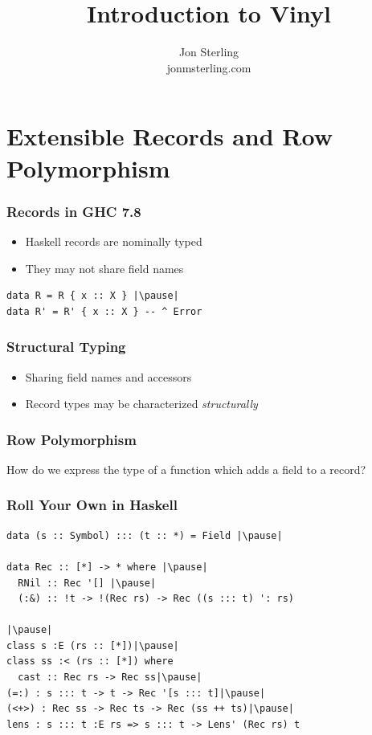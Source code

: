 \documentclass[tikz, 12pt]{beamer}
\title{Introduction to Vinyl}
\author{Jon Sterling\\
  jonmsterling.com
}
\begin{document}
\begin{frame}
\titlepage
\end{frame}

\section{Extensible Records and Row Polymorphism}

\begin{frame}[fragile]
  \frametitle{Records in GHC 7.8}\pause
  \begin{itemize}
    \item Haskell records are nominally typed\pause
    \item They may not share field names
  \end{itemize}
  \pause
  \begin{lstlisting}
data R = R { x :: X } |\pause|
data R' = R' { x :: X } -- ^ Error
  \end{lstlisting}
\end{frame}

\begin{frame}
  \frametitle{Structural Typing}\pause
  \begin{itemize}
    \item Sharing field names and accessors\pause
    \item Record types may be characterized \emph{structurally}
  \end{itemize}
\end{frame}

\begin{frame}
  \frametitle{Row Polymorphism}\pause
  How do we express the type of a function which adds a field to a record?\pause
\end{frame}

\begin{frame}[fragile]
  \frametitle{Roll Your Own in Haskell}\pause
  \begin{lstlisting}
data (s :: Symbol) ::: (t :: *) = Field |\pause|

data Rec :: [*] -> * where |\pause|
  RNil :: Rec '[] |\pause|
  (:&) :: !t -> !(Rec rs) -> Rec ((s ::: t) ': rs)

|\pause|
class s :E (rs :: [*])|\pause|
class ss :< (rs :: [*]) where
  cast :: Rec rs -> Rec ss|\pause|
(=:) : s ::: t -> t -> Rec '[s ::: t]|\pause|
(<+>) : Rec ss -> Rec ts -> Rec (ss ++ ts)|\pause|
lens : s ::: t :E rs => s ::: t -> Lens' (Rec rs) t
  \end{lstlisting}
\end{frame}
\end{document}
